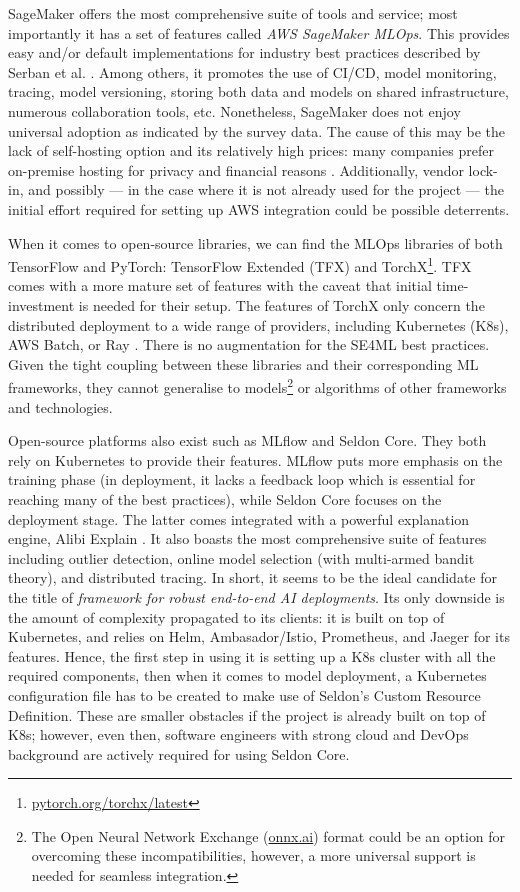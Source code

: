 SageMaker offers the most comprehensive suite of tools and service; most importantly it has a set of features called \textit{AWS SageMaker MLOps}. This provides easy and/or default implementations for industry best practices described by Serban et al. \cite{serban2020adoption,serban2021practices}. Among others, it promotes the use of CI/CD, model monitoring, tracing, model versioning, storing both data and models on shared infrastructure, numerous collaboration tools, etc. Nonetheless, SageMaker does not enjoy universal adoption as indicated by the survey data. The cause of this may be the lack of self-hosting option and its relatively high prices: many companies prefer on-premise hosting for privacy and financial reasons \cite{bosch2021engineering}. Additionally, vendor lock-in, and possibly --- in the case where it is not already used for the project --- the initial effort required for setting up AWS integration could be possible deterrents.

When it comes to open-source libraries, we can find the MLOps libraries of both TensorFlow and PyTorch: TensorFlow Extended (TFX) \cite{baylor2017tfx} and TorchX\footnote{\href{https://pytorch.org/torchx/latest/}{pytorch.org/torchx/latest}}. TFX comes with a more mature set of features with the caveat that initial time-investment is needed for their setup. The features of TorchX only concern the distributed deployment to a wide range of providers, including Kubernetes (K8s), AWS Batch, or Ray \cite{moritz2018ray}. There is no augmentation for the SE4ML best practices. Given the tight coupling between these libraries and their corresponding ML frameworks, they cannot generalise to models\footnote{The Open Neural Network Exchange (\href{https://onnx.ai/}{onnx.ai}) format could be an option for overcoming these incompatibilities, however, a more universal support is needed for seamless integration.} or algorithms of other frameworks and technologies. 

Open-source platforms also exist such as MLflow and Seldon Core. They both rely on Kubernetes to provide their features. MLflow puts more emphasis on the training phase (in deployment, it lacks a feedback loop which is essential for reaching many of the best practices), while Seldon Core focuses on the deployment stage. The latter comes integrated with a powerful explanation engine, Alibi Explain \cite{klaise2021alibi}. It also boasts the most comprehensive suite of features including outlier detection, online model selection (with multi-armed bandit theory), and distributed tracing. In short, it seems to be the ideal candidate for the title of \textit{framework for robust end-to-end AI deployments}. Its only downside is the amount of complexity propagated to its clients: it is built on top of Kubernetes, and relies on Helm, Ambasador/Istio, Prometheus, and Jaeger for its features. Hence, the first step in using it is setting up a K8s cluster with all the required components, then when it comes to model deployment, a Kubernetes configuration file has to be created to make use of Seldon's Custom Resource Definition. These are smaller obstacles if the project is already built on top of K8s; however, even then, software engineers with strong cloud and DevOps background are actively required for using Seldon Core.

